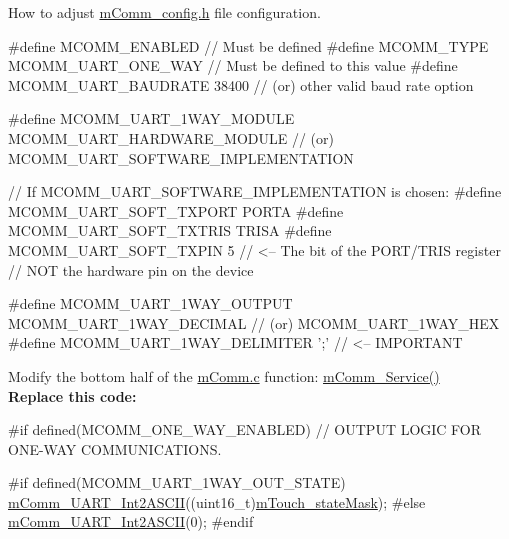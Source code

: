 \begin{DoxyEnumerate}
\item How to adjust \hyperlink{m_comm__config_8h}{m\+Comm\+\_\+config.\+h} file configuration. 
\begin{DoxyCode}
\textcolor{preprocessor}{#define MCOMM\_ENABLED                                             // Must be defined}
\textcolor{preprocessor}{#define MCOMM\_TYPE                    MCOMM\_UART\_ONE\_WAY          // Must be defined to this value}
\textcolor{preprocessor}{#define MCOMM\_UART\_BAUDRATE           38400                       // (or) other valid baud rate option}
\end{DoxyCode}
 
\begin{DoxyCode}
\textcolor{preprocessor}{#define MCOMM\_UART\_1WAY\_MODULE        MCOMM\_UART\_HARDWARE\_MODULE  // (or)
       MCOMM\_UART\_SOFTWARE\_IMPLEMENTATION}

  \textcolor{comment}{// If MCOMM\_UART\_SOFTWARE\_IMPLEMENTATION is chosen:}
\textcolor{preprocessor}{  #define MCOMM\_UART\_SOFT\_TXPORT        PORTA}
\textcolor{preprocessor}{  #define MCOMM\_UART\_SOFT\_TXTRIS        TRISA   }
\textcolor{preprocessor}{  #define MCOMM\_UART\_SOFT\_TXPIN         5       // <-- The bit of the PORT/TRIS register}
\textcolor{preprocessor}{                                                //     NOT the hardware pin on the device}
\end{DoxyCode}
 
\begin{DoxyCode}
\textcolor{preprocessor}{#define MCOMM\_UART\_1WAY\_OUTPUT        MCOMM\_UART\_1WAY\_DECIMAL     // (or) MCOMM\_UART\_1WAY\_HEX        }
\textcolor{preprocessor}{#define MCOMM\_UART\_1WAY\_DELIMITER     ';'                         // <-- IMPORTANT                  }
\end{DoxyCode}



\item Modify the bottom half of the \hyperlink{m_comm_8c}{m\+Comm.\+c} function\+: \hyperlink{m_comm_8c_a8bfb942a7ae7836ae9748b1c294ece05}{m\+Comm\+\_\+\+Service()}~\newline
~\newline
 {\bfseries Replace this code\+:} 
\begin{DoxyCode}
\textcolor{preprocessor}{#if defined(MCOMM\_ONE\_WAY\_ENABLED)}
    \textcolor{comment}{// OUTPUT LOGIC FOR ONE-WAY COMMUNICATIONS.}

\textcolor{preprocessor}{    #if defined(MCOMM\_UART\_1WAY\_OUT\_STATE)}
    \hyperlink{m_comm_8c_af25da52c9da7c8fa9337c43ad5d7a1b6}{mComm\_UART\_Int2ASCII}((uint16\_t)\hyperlink{m_touch_8c_ab288c49098e419b3232336a4245b757d}{mTouch\_stateMask});
\textcolor{preprocessor}{    #else}
    \hyperlink{m_comm_8c_af25da52c9da7c8fa9337c43ad5d7a1b6}{mComm\_UART\_Int2ASCII}(0);
\textcolor{preprocessor}{    #endif}
    

\end{DoxyCode}
\end{DoxyEnumerate}
